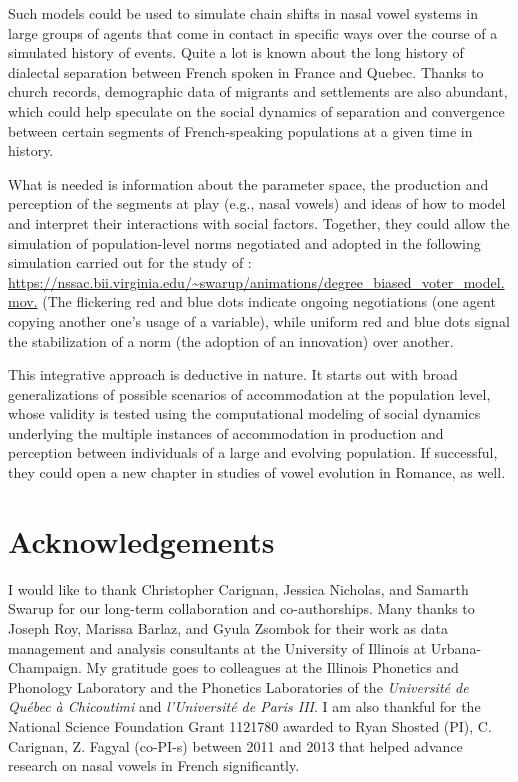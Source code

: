 \documentclass[output=paper,colorlinks,citecolor=brown]{langscibook}
\begin{document}
Such models could be used to simulate chain shifts in nasal vowel systems in large groups of agents that come in contact in specific ways over the course of a simulated history of events. Quite a lot is known about the long history of dialectal separation between French spoken in France and Quebec. Thanks to church records, demographic data of migrants and settlements are also abundant, which could help speculate on the social dynamics of separation and convergence between certain segments of French-speaking populations at a given time in history.

What is needed is information about the parameter space, the production and perception of the segments at play (e.g., nasal vowels) and ideas of how to model and interpret their interactions with social factors. Together, they could allow the simulation of population-level norms negotiated and adopted in the following simulation carried out for the study of \citet{Fagyal2010}: \url{https://nssac.bii.virginia.edu/~swarup/animations/degree_biased_voter_model.mov.} (The flickering red and blue dots indicate ongoing negotiations (one agent copying another one’s usage of a variable), while uniform red and blue dots signal the stabilization of a norm (the adoption of an innovation) over another.

This integrative approach is deductive in nature. It starts out with broad generalizations of possible scenarios of accommodation at the population level, whose validity is tested using the computational modeling of social dynamics underlying the multiple instances of accommodation in production and perception between individuals of a large and evolving population. If successful, they could open a new chapter in studies of vowel evolution in Romance, as well.

\section*{Acknowledgements}

I would like to thank  Christopher Carignan,  Jessica Nicholas, and  Samarth Swa\-rup for our long-term collaboration and co-authorships. Many thanks to  Joseph Roy,  Marissa Barlaz, and  Gyula Zsombok for their work as data management and analysis consultants at the University of Illinois at Urbana-Champaign. My gratitude goes to colleagues at the Illinois Phonetics and Phonology Laboratory and the Phonetics Laboratories of the \textit{Université de Québec à Chicoutimi} and \textit{l’Université de Paris III}. I am also thankful for the National Science Foundation Grant 1121780 awarded to Ryan Shosted (PI), C. Carignan, Z. Fagyal (co-PI-s) between 2011 and 2013 that helped advance research on nasal vowels in French significantly.

\printbibliography[heading=subbibliography,notkeyword=this]
\end{document}
